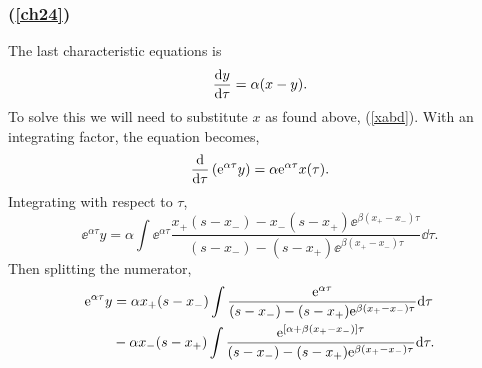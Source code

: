 \subsubsection*{(\ref{ch24})}
The last characteristic equations is
$$\displaystyle\frac{{\rm d} y}{{\rm d} \tau} = \alpha(x-y).$$
To solve this we will need to substitute $x$ as found above, (\ref{xabd}). With an integrating factor, the equation becomes,
$$\displaystyle\frac{{\rm d} }{{\rm d} \tau}\left({\rm e}^{\alpha\tau} y\right) = \alpha {\rm e}^{\alpha\tau} x(\tau).$$
Integrating with respect to $\tau$,
$$\ee^{\alpha\tau }y = \alpha\int \ee^{\alpha\tau} \frac{x_+(s-x_-) - x_-(s-x_+)\ee^{\beta(x_+-x_-)\tau}}{(s-x_-) - (s-x_+)\ee^{\beta(x_+-x_-) \tau}} \dd\tau.$$ 
Then splitting the numerator, 
\begin{align}
\label{bigdoubleints}
{\rm e}^{\alpha\tau }y &=  \alpha x_+(s-x_-) \int \frac{ {\rm e}^{\alpha \tau} } {(s-x_-) - (s-x_+){\rm e}^{\beta(x_+-x_-) \tau}}{\rm d}\tau \notag \\ 
&-\alpha x_-(s-x_+)\int\frac{{\rm e}^{\left[ \alpha + \beta(x_+-x_-) \right]\tau}}{(s-x_-) - (s-x_+){\rm e}^{\beta(x_+-x_-) \tau}}{\rm d}\tau.
\end{align}

